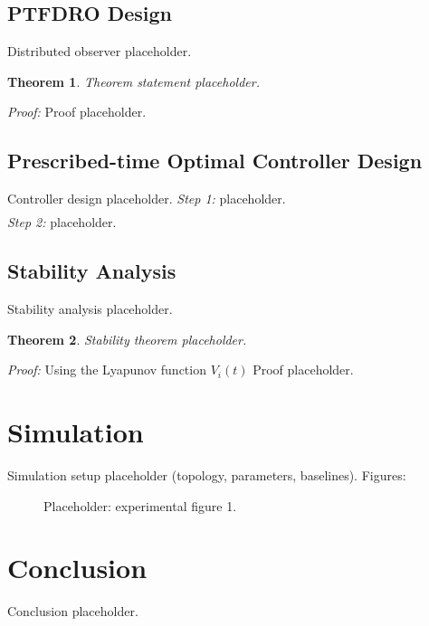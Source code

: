\documentclass[lettersize,journal]{IEEEtran}
\newtheorem{theorem}{Theorem}
\begin{document}
{\subsection{PTFDRO Design}}
Distributed observer placeholder.
\begin{theorem}
Theorem statement placeholder.
\label{thm:1}
\end{theorem}
\textit{Proof:} Proof placeholder.

{\subsection{Prescribed-time Optimal Controller Design}}
Controller design placeholder.
\textit{Step 1:} placeholder.
\begin{align}
\label{eq:controller}
\end{align}
\textit{Step 2:} placeholder.

{\subsection{Stability Analysis}}
Stability analysis placeholder.
\begin{theorem}
Stability theorem placeholder.
\label{thm:2}
\end{theorem}
\textit{Proof:} Using the Lyapunov function $V_i(t)$ Proof placeholder.

\section{Simulation}
Simulation setup placeholder (topology, parameters, baselines). Figures:

\begin{figure}[h]
	\centering
	\caption{Placeholder: experimental figure 1.}
	\label{fig:1}
\end{figure}

\section{Conclusion}
Conclusion placeholder.



\end{document}
